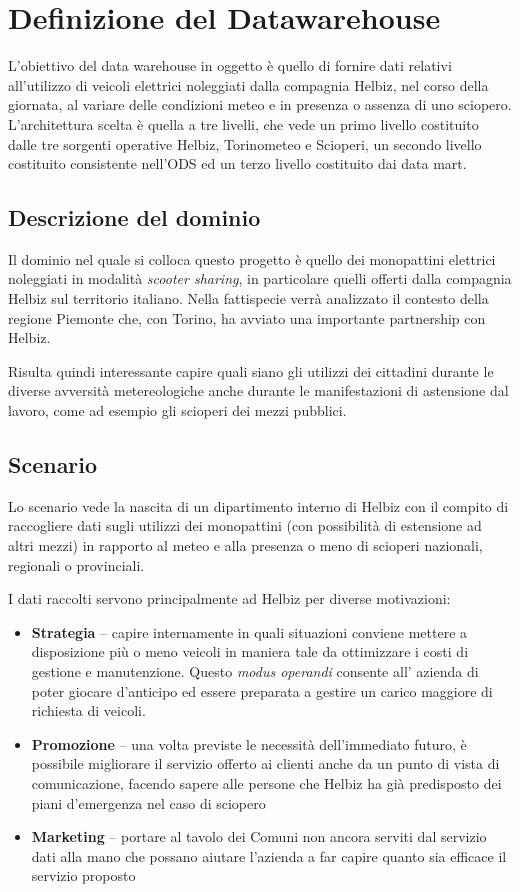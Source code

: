 \chapter{Definizione del Datawarehouse}

L'obiettivo del data warehouse in oggetto è quello di fornire dati relativi
all'utilizzo di veicoli elettrici noleggiati dalla compagnia Helbiz, nel corso
della giornata, al variare delle condizioni meteo e in presenza o assenza di uno
sciopero.
L'architettura scelta è quella a tre livelli, che vede un primo livello costituito
dalle tre sorgenti operative Helbiz, Torinometeo e Scioperi, un secondo livello
costituito consistente nell'ODS ed un terzo livello costituito dai data mart.

\section{Descrizione del dominio}
Il dominio nel quale si colloca questo progetto è quello dei monopattini elettrici noleggiati in
modalità \emph{scooter sharing}, in particolare quelli offerti dalla compagnia Helbiz sul territorio italiano.
Nella fattispecie verrà analizzato il contesto della regione Piemonte che, con Torino, ha avviato una importante
partnership con Helbiz.

Risulta quindi interessante capire quali siano gli utilizzi dei cittadini durante le diverse avversità metereologiche
anche durante le manifestazioni di astensione dal lavoro, come ad esempio gli scioperi dei mezzi pubblici.


\section{Scenario}
Lo scenario vede la nascita di un dipartimento interno di Helbiz con il compito di raccogliere dati sugli
utilizzi dei monopattini (con possibilità di estensione ad altri mezzi) in rapporto al meteo e alla presenza
o meno di scioperi nazionali, regionali o provinciali.

I dati raccolti servono principalmente ad Helbiz per diverse motivazioni:
\begin{itemize}
	\item{\textbf{Strategia} -- capire internamente in quali situazioni conviene mettere a disposizione più o meno veicoli in maniera tale da ottimizzare i costi di gestione e manutenzione.
	Questo \emph{modus operandi} consente all' azienda di poter giocare d'anticipo ed essere preparata a gestire un carico maggiore di richiesta di veicoli.}
	\item{\textbf{Promozione} -- una volta previste le necessità dell'immediato futuro, è possibile migliorare il servizio offerto ai clienti anche da un punto di vista di comunicazione,
	facendo sapere alle persone che Helbiz ha già predisposto dei piani d'emergenza nel caso di sciopero}
	\item{\textbf{Marketing} -- portare al tavolo dei Comuni non ancora serviti dal servizio dati alla mano che possano aiutare l'azienda a far capire quanto sia efficace il servizio proposto}
\end{itemize}

